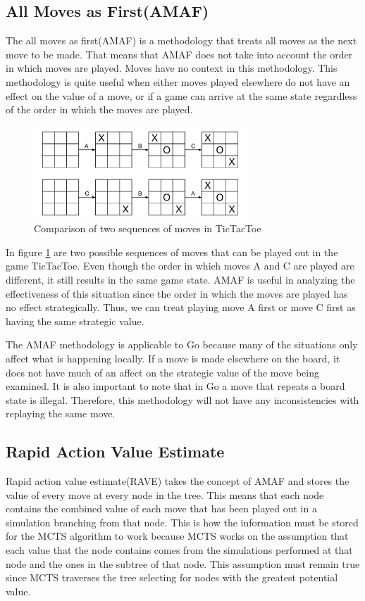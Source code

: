 \documentclass{sig-alternate}
\begin{document}
\subsection{All Moves as First(AMAF)}
The all moves as first(AMAF) is a methodology that treats all moves as the next move to be made. That means that AMAF does not take into account the order in which moves are played. Moves have no context in this methodology. This methodology is quite useful when either moves played elsewhere do not have an effect on the value of a move, or if a game can arrive at the same state regardless of the order in which the moves are played.

\begin{figure}[h]
	\includegraphics[width=8cm]{MoveOrderNotMattering.pdf}
	\centering
	\caption{Comparison of two sequences of moves in TicTacToe}
	\label{fig:TwoSeq}
\end{figure}

In figure \ref{fig:TwoSeq} are two possible sequences of moves that can be played out in the game TicTacToe. Even though the order in which moves A and C are played are different, it still results in the same game state. AMAF is useful in analyzing the effectiveness of this situation since the order in which the moves are played has no effect strategically. Thus, we can treat playing move A first or move C first as having the same strategic value.

The AMAF methodology is applicable to Go because many of the situations only affect what is happening locally. If a move is made elsewhere on the board, it does not have much of an affect on the strategic value of the move being examined. It is also important to note that in Go a move that repeats a board state is illegal. Therefore, this methodology will not have any inconsistencies with replaying the same move.

\subsection{Rapid Action Value Estimate}
Rapid action value estimate(RAVE) takes the concept of AMAF and stores the value of every move at every node in the tree. This means that each node contains the combined value of each move that has been played out in a simulation branching from that node. This is how the information must be stored for the MCTS algorithm to work because MCTS works on the assumption that each value that the node contains comes from the simulations performed at that node and the ones in the subtree of that node. This assumption must remain true since MCTS traverses the tree selecting for nodes with the greatest potential value.
\end{document}
